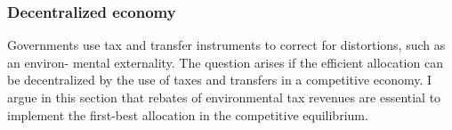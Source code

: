 \subsubsection{Decentralized economy}\label{subsec:decen_ec}

Governments use tax and transfer instruments to correct for distortions, such as an environ- mental externality. The question arises if the efficient allocation can be decentralized by the use of taxes and transfers in a competitive economy. %
I argue in this section that rebates of environmental tax revenues are essential to implement the first-best allocation in the competitive equilibrium. %



